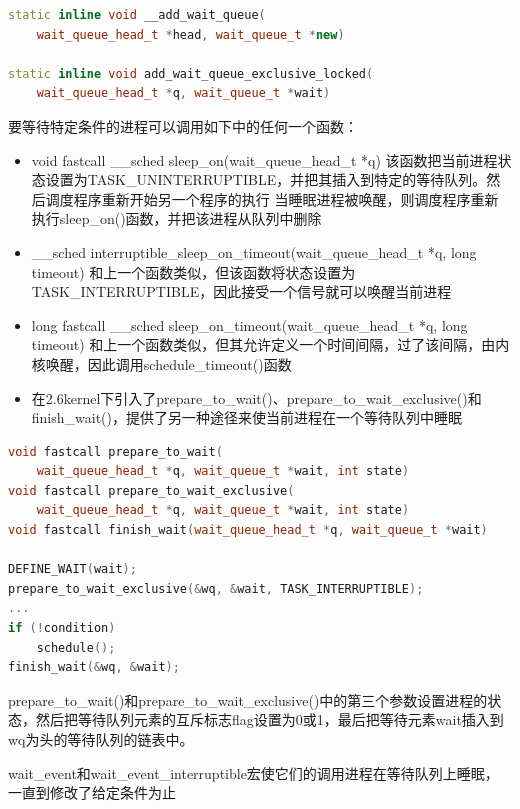 \begin{lstlisting}[language=C++]
static inline void __add_wait_queue(
    wait_queue_head_t *head, wait_queue_t *new)

static inline void add_wait_queue_exclusive_locked(
    wait_queue_head_t *q, wait_queue_t *wait)
\end{lstlisting}

    要等待特定条件的进程可以调用如下中的任何一个函数：

\begin{itemize}
    \item void fastcall \_\_sched sleep\_on(wait\_queue\_head\_t *q)
    \subitem 该函数把当前进程状态设置为TASK\_UNINTERRUPTIBLE，并把其插入到特定的等待队列。然后调度程序重新开始另一个程序的执行
    \subitem 当睡眠进程被唤醒，则调度程序重新执行sleep\_on()函数，并把该进程从队列中删除
    \item \_\_sched interruptible\_sleep\_on\_timeout(wait\_queue\_head\_t *q, long timeout)
    \subitem 和上一个函数类似，但该函数将状态设置为TASK\_INTERRUPTIBLE，因此接受一个信号就可以唤醒当前进程
    \item long fastcall \_\_sched sleep\_on\_timeout(wait\_queue\_head\_t *q, long timeout)
    \subitem 和上一个函数类似，但其允许定义一个时间间隔，过了该间隔，由内核唤醒，因此调用schedule\_timeout()函数
    \item 在2.6kernel下引入了prepare\_to\_wait()、prepare\_to\_wait\_exclusive()和finish\_wait()，提供了另一种途径来使当前进程在一个等待队列中睡眠
\end{itemize}

\begin{lstlisting}[language=C++]
void fastcall prepare_to_wait(
    wait_queue_head_t *q, wait_queue_t *wait, int state)
void fastcall prepare_to_wait_exclusive(
    wait_queue_head_t *q, wait_queue_t *wait, int state)
void fastcall finish_wait(wait_queue_head_t *q, wait_queue_t *wait)

DEFINE_WAIT(wait);
prepare_to_wait_exclusive(&wq, &wait, TASK_INTERRUPTIBLE);
...
if (!condition)
    schedule();
finish_wait(&wq, &wait);
\end{lstlisting}

    prepare\_to\_wait()和prepare\_to\_wait\_exclusive()中的第三个参数设置进程的状态，然后把等待队列元素的互斥标志flag设置为0或1，最后把等待元素wait插入到wq为头的等待队列的链表中。

    wait\_event和wait\_event\_interruptible宏使它们的调用进程在等待队列上睡眠，一直到修改了给定条件为止

